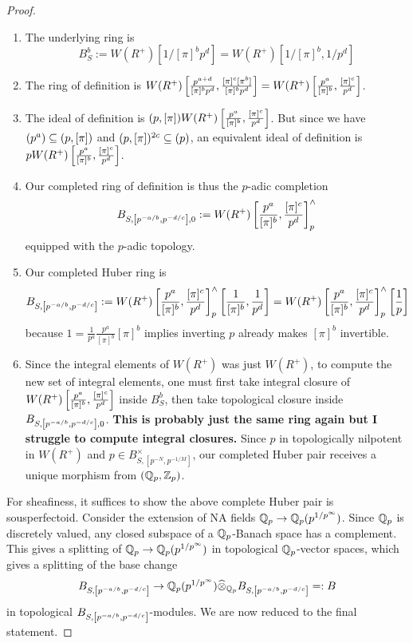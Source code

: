 \documentclass{article}
\begin{document}
\begin{proof}
\begin{enumerate}
    \item The underlying ring is 
    \[
      B_S^b := W(R^+)[1 / [\pi]^b p^d] = W(R^+)[1 / [\pi]^b , 1 / p^d]
    \]

    \item The ring of definition is
    $W(R^+)\left[\frac{p^{a + d}}{[\pi]^b p^d} , 
      \frac{[\pi]^{c}[\pi^{b}]}{[\pi]^b p^d}\right]
    = W(R^+)\left[\frac{p^a}{[\pi]^b} , \frac{[\pi]^c}{p^d}\right]$.

    \item The ideal of definition is
    $(p , [\pi]) W(R^+)\left[\frac{p^a}{[\pi]^b} , \frac{[\pi]^c}{p^d}\right]$.
    But since we have 
    $(p^a) \subseteq (p , [\pi])$
    and $(p , [\pi])^{2 c} \subseteq (p)$,
    an equivalent ideal of definition is 
    $pW(R^+)\left[\frac{p^a}{[\pi]^b} , \frac{[\pi]^c}{p^d}\right]$.

    \item Our completed ring of definition is
    thus the $p$-adic completion \[
      B_{S , \left[p^{- a / b} , p^{- d / c}\right], 0} := 
      W(R^+)\left[\frac{p^a}{[\pi]^b} , \frac{[\pi]^c}{p^d}\right]^\wedge_p
    \]
    equipped with the $p$-adic topology.

    \item Our completed Huber ring is \[
      B_{S , \left[p^{- a / b} , p^{- d / c}\right]} := 
        W(R^+)\left[\frac{p^a}{[\pi]^b} , \frac{[\pi]^c}{p^d}\right]^\wedge_p
        \left[\frac{1}{[\pi]^b} , \frac{1}{p^d}\right]
      = W(R^+)\left[\frac{p^a}{[\pi]^b} , \frac{[\pi]^c}{p^d}\right]^\wedge_p
      \left[\frac{1}{p}\right]
    \]
    because $1 = \frac{1}{p^a} \frac{p^a}{[\pi]^b} [\pi]^b$
    implies inverting $p$ already makes $[\pi]^b$ invertible.

    \item Since the integral elements of $W(R^+)$ was 
    just $W(R^+)$,
    to compute the new set of integral elements,
    one must first take integral closure of 
    $W(R^+)\left[\frac{p^a}{[\pi]^b} , \frac{[\pi]^c}{p^d}\right]$
    inside $B^b_S$,
    then take topological closure
    inside $B_{S , \left[p^{- a / b} , p^{- d / c}\right], 0}$.
    \textbf{This is probably just the same ring again
    but I struggle to compute integral closures.}
    Since $p$ in topologically nilpotent in $W(R^+)$
    and $p \in B_{S , [p^{- N} , p^{- 1 / M}]}^\times$,
    our completed Huber pair receives a unique morphism
    from $(\mathbb{Q}_p , \mathbb{Z}_p)$.
  \end{enumerate}
  For sheafiness,
  it suffices to show the above complete Huber pair is sousperfectoid.
  Consider the extension of NA fields $\mathbb{Q}_p \to \mathbb{Q}_p(p^{1 / p^\infty})$.
  Since $\mathbb{Q}_p$ is discretely valued,
  any closed subspace of a $\mathbb{Q}_p$-Banach space has a complement.
  \cite[Prop. 10.5]{Sch13}
  This gives a splitting of $\mathbb{Q}_p \to \mathbb{Q}_p(p^{1 / p^\infty})$
  in topological $\mathbb{Q}_p$-vector spaces,
  which gives a splitting of the base change \[
    B_{S , \left[p^{- a / b} , p^{- d / c}\right]} \to 
    \mathbb{Q}_p(p^{1 / p^\infty}) \widehat{\otimes}_{\mathbb{Q}_p} 
    B_{S , \left[p^{- a / b} , p^{- d / c}\right]}
    =: B
  \]
  in topological $B_{S , \left[p^{- a / b} , p^{- d / c}\right]}$-modules.
  We are now reduced to the final statement.
  

\end{proof}
\end{document}
